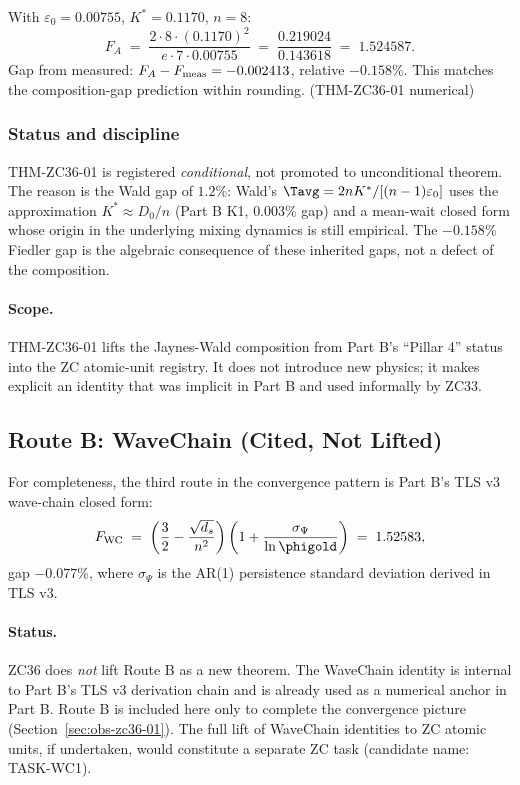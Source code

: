 \documentclass[12pt, a4paper]{article}
\begin{document}
\begin{derivedbox}[title={THM-ZC36-01: Numerical verification}]
With $\varepsilon_0 = 0.00755$, $K^* = 0.1170$, $n = 8$:
\[
  F_A
  \;=\; \frac{2 \cdot 8 \cdot (0.1170)^2}
       {e \cdot 7 \cdot 0.00755}
  \;=\; \frac{0.219024}
       {0.143618}
  \;=\; 1.524587.
\]
Gap from measured: $F_A - F_{\rm meas} = -0.002413$,
relative $-0.158\%$. This matches the composition-gap
prediction within rounding.
\hfill\textup{(THM-ZC36-01 numerical)}
\end{derivedbox}

\subsubsection{Status and discipline}

THM-ZC36-01 is registered \emph{conditional}, not promoted to
unconditional theorem. The reason is the Wald gap of $1.2\%$:
Wald's $\Tavg = 2nK^*/[(n-1)\varepsilon_0]$ uses the
approximation $K^* \approx D_0/n$ (Part B K1, $0.003\%$ gap)
and a mean-wait closed form whose origin in the underlying
mixing dynamics is still empirical. The $-0.158\%$ Fiedler gap
is the algebraic consequence of these inherited gaps, not a
defect of the composition.

\paragraph{Scope.}
THM-ZC36-01 lifts the Jaynes-Wald composition from Part B's
``Pillar 4'' status into the ZC atomic-unit registry. It does
not introduce new physics; it makes explicit an identity that
was implicit in Part B and used informally by ZC33.

\subsection{Route B: WaveChain (Cited, Not Lifted)}
\label{sec:route-b}

For completeness, the third route in the convergence pattern
is Part B's TLS v3 wave-chain closed form:
\[
  F_{\rm WC}
  \;=\; \left(\frac{3}{2} - \frac{\sqrt{d_s}}{n^2}\right)
        \left(1 + \frac{\sigma_\Psi}{\ln \phigold}\right)
  \;=\; 1.52583,
\]
gap $-0.077\%$, where $\sigma_\Psi$ is the AR(1) persistence
standard deviation derived in TLS v3.

\paragraph{Status.}
ZC36 does \emph{not} lift Route B as a new theorem. The
WaveChain identity is internal to Part B's TLS v3 derivation
chain and is already used as a numerical anchor in Part B.
Route B is included here only to complete the convergence
picture (Section~\ref{sec:obs-zc36-01}). The full lift of
WaveChain identities to ZC atomic units, if undertaken, would
constitute a separate ZC task (candidate name: TASK-WC1).
\end{document}
